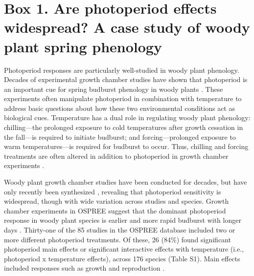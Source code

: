 \documentclass{article}
\begin{document}
\section*{Box 1. Are photoperiod effects widespread? A case study of woody plant spring phenology}
Photoperiod responses are particularly well-studied in woody plant phenology. Decades of experimental growth chamber studies have shown that photoperiod is an important cue for spring budburst phenology in woody plants \citep[e.g.,][]{flynn2018,Basler:2014aa,Heide:1993a}. These experiments often manipulate photoperiod in combination with temperature to address basic questions about how these two environmental conditions act as biological cues. Temperature has a dual role in regulating woody plant phenology: chilling---the prolonged exposure to cold temperatures after growth cessation in the fall---is required to initiate budburst; and forcing---prolonged exposure to warm temperatures---is required for budburst to occur. Thus, chilling and forcing treatments are often altered in addition to photoperiod in growth chamber experiments \citep[e.g.,][]{Campbell:1975aa,Falusi:1990aa,HEIDE:1977aa,Laube:2014a,Spann:2004aa}. %

\par Woody plant growth chamber studies have been conducted for decades, but have only recently been synthesized \citep{wolkovich2019}, revealing that photoperiod sensitivity is widespread, though with wide variation across studies and species. Growth chamber experiments in OSPREE suggest that the dominant photoperiod response in woody plant species is earlier and more rapid budburst with longer days \citep [e.g., ][]{Caffarra:2011a}. Thirty-one of the 85 studies in the OSPREE database included two or more different photoperiod treatments. Of these, 26 (84\%) found significant photoperiod main effects or significant interactive effects with temperature (i.e., photoperiod x temperature effects), across 176 species (Table S1). Main effects included responses such as growth \citep[e.g., higher growth rates with longer days][]{Ashby:1962aa} and reproduction \citep[e.g., increased flowering with longer days][]{Heide:2012aa}. 
\end{document}
